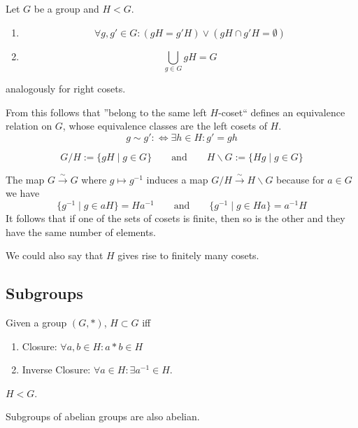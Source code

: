 \begin{proposition}
   Let \(G\) be a group and \(H < G\).
   \begin{enumerate}[label=\roman*, align=Center]
      \item \[\forall g, g' \in G: (gH = g'H) \lor (gH \cap g'H = \emptyset)\]
      \item \[\bigcup_{g \in G} gH = G\]
   \end{enumerate}
   analogously for right cosets.
\end{proposition}
\begin{remark}
   From this follows that ''belong to the same left \(H\)-coset`` defines an equivalence relation on \(G\), whose equivalence classes are the left cosets of \(H\).
\[g \sim g' :\iff \exists h \in H: g' = gh\]
\end{remark}

\begin{definition}
   \[G/H := \{gH \mid g \in G\} \qquad\text{and}\qquad H\backslash G := \{Hg \mid g \in G\}\]
\end{definition}
\begin{remark}
   The map \(G \xrightarrow{\sim} G\) where \(g \mapsto g^{-1}\) induces a map \(G/H \xrightarrow{\sim} H\backslash G\) because for \(a \in G\) we have
   \[\{g^{-1} \mid g \in aH\} = Ha^{-1} \qquad\text{and}\qquad \{g^{-1} \mid g \in Ha\} = a^{-1}H\]
   It follows that if one of the sets of cosets is finite, then so is the other and they have the same number of elements.

   We could also say that \(H\) gives rise to finitely many cosets.
\end{remark}

\subsection{Subgroups}
\begin{definition}[Subgroup]
   Given a group \((G, \ast)\), \(H \subset G\) iff
   \begin{enumerate}[label=\roman*, align=Center]
      \item Closure: \(\forall a, b \in H: a \ast b \in H\)
      \item Inverse Closure: \(\forall a \in H: \exists a^{-1} \in H\).
   \end{enumerate}
\end{definition}
\begin{remark}[Notation]
   \(H < G\).
\end{remark}
\begin{remark}
   Subgroups of abelian groups are also abelian.
\end{remark}

